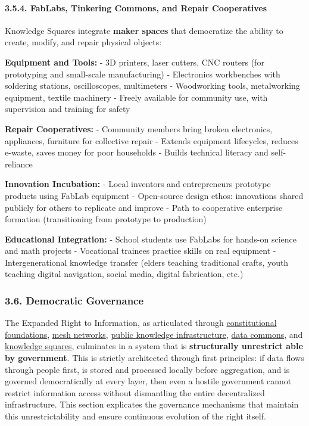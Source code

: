 \paragraph{3.5.4. FabLabs, Tinkering Commons, and Repair
Cooperatives}\label{fablabs-tinkering-commons-and-repair-cooperatives}

Knowledge Squares integrate \textbf{maker spaces} that democratize the
ability to create, modify, and repair physical objects:

\textbf{Equipment and Tools:} - 3D printers, laser cutters, CNC routers
(for prototyping and small-scale manufacturing) - Electronics
workbenches with soldering stations, oscilloscopes, multimeters -
Woodworking tools, metalworking equipment, textile machinery - Freely
available for community use, with supervision and training for safety

\textbf{Repair Cooperatives:} - Community members bring broken
electronics, appliances, furniture for collective repair - Extends
equipment lifecycles, reduces e-waste, saves money for poor households -
Builds technical literacy and self-reliance

\textbf{Innovation Incubation:} - Local inventors and entrepreneurs
prototype products using FabLab equipment - Open-source design ethos:
innovations shared publicly for others to replicate and improve - Path
to cooperative enterprise formation (transitioning from prototype to
production)

\textbf{Educational Integration:} - School students use FabLabs for
hands-on science and math projects - Vocational trainees practice skills
on real equipment - Intergenerational knowledge transfer (elders
teaching traditional crafts, youth teaching digital navigation, social
media, digital fabrication, etc.)

\subsubsection{3.6. Democratic Governance}\label{democratic-governance}

The Expanded Right to Information, as articulated through
\hyperref[31-constitutional-foundations]{constitutional foundations},
\hyperref[32-the-peoples-internet]{mesh networks},
\hyperref[33-public-knowledge-infrastructure]{public knowledge
infrastructure},
\hyperref[34-reciprocal-data-commons-social-processes-to-collective-intelligence]{data
commons}, and \hyperref[35-knowledge-squares]{knowledge squares},
culminates in a system that is \textbf{structurally unrestrict able by
government}. This is strictly architected through first principles: if
data flows through people first, is stored and processed locally before
aggregation, and is governed democratically at every layer, then even a
hostile government cannot restrict information access without
dismantling the entire decentralized infrastructure. This section
explicates the governance mechanisms that maintain this
unrestrictability and ensure continuous evolution of the right itself.

